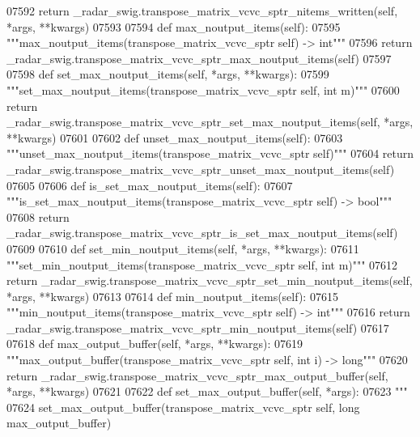 \begin{DoxyCode}
{{{{{{{{{{{{{{{{{{{{{{{{{07592         \textcolor{keywordflow}{return} \_radar\_swig.transpose\_matrix\_vcvc\_sptr\_nitems\_written(self, *args, **kwargs)
07593 
07594     \textcolor{keyword}{def }max_noutput_items(self):
07595         \textcolor{stringliteral}{"""max\_noutput\_items(transpose\_matrix\_vcvc\_sptr self) -> int"""}
07596         \textcolor{keywordflow}{return} \_radar\_swig.transpose\_matrix\_vcvc\_sptr\_max\_noutput\_items(self)
07597 
07598     \textcolor{keyword}{def }set_max_noutput_items(self, *args, **kwargs):
07599         \textcolor{stringliteral}{"""set\_max\_noutput\_items(transpose\_matrix\_vcvc\_sptr self, int m)"""}
07600         \textcolor{keywordflow}{return} \_radar\_swig.transpose\_matrix\_vcvc\_sptr\_set\_max\_noutput\_items(self, *args, **kwargs)
07601 
07602     \textcolor{keyword}{def }unset_max_noutput_items(self):
07603         \textcolor{stringliteral}{"""unset\_max\_noutput\_items(transpose\_matrix\_vcvc\_sptr self)"""}
07604         \textcolor{keywordflow}{return} \_radar\_swig.transpose\_matrix\_vcvc\_sptr\_unset\_max\_noutput\_items(self)
07605 
07606     \textcolor{keyword}{def }is_set_max_noutput_items(self):
07607         \textcolor{stringliteral}{"""is\_set\_max\_noutput\_items(transpose\_matrix\_vcvc\_sptr self) -> bool"""}
07608         \textcolor{keywordflow}{return} \_radar\_swig.transpose\_matrix\_vcvc\_sptr\_is\_set\_max\_noutput\_items(self)
07609 
07610     \textcolor{keyword}{def }set_min_noutput_items(self, *args, **kwargs):
07611         \textcolor{stringliteral}{"""set\_min\_noutput\_items(transpose\_matrix\_vcvc\_sptr self, int m)"""}
07612         \textcolor{keywordflow}{return} \_radar\_swig.transpose\_matrix\_vcvc\_sptr\_set\_min\_noutput\_items(self, *args, **kwargs)
07613 
07614     \textcolor{keyword}{def }min_noutput_items(self):
07615         \textcolor{stringliteral}{"""min\_noutput\_items(transpose\_matrix\_vcvc\_sptr self) -> int"""}
07616         \textcolor{keywordflow}{return} \_radar\_swig.transpose\_matrix\_vcvc\_sptr\_min\_noutput\_items(self)
07617 
07618     \textcolor{keyword}{def }max_output_buffer(self, *args, **kwargs):
07619         \textcolor{stringliteral}{"""max\_output\_buffer(transpose\_matrix\_vcvc\_sptr self, int i) -> long"""}
07620         \textcolor{keywordflow}{return} \_radar\_swig.transpose\_matrix\_vcvc\_sptr\_max\_output\_buffer(self, *args, **kwargs)
07621 
07622     \textcolor{keyword}{def }set_max_output_buffer(self, *args):
07623         \textcolor{stringliteral}{"""}
07624 \textcolor{stringliteral}{        set\_max\_output\_buffer(transpose\_matrix\_vcvc\_sptr self, long max\_output\_buffer)}
}}}}}}}}}}}}}}}}}}}}}}}}}
\end{DoxyCode}
